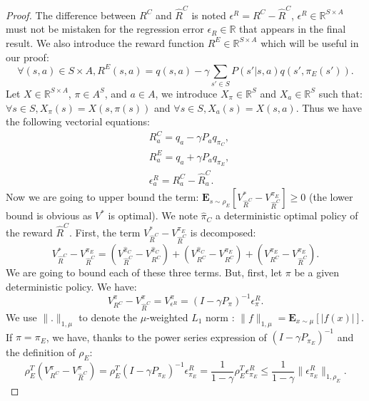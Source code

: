\documentclass[smallextended]{svjour3}
\newcommand{\E}{\mathbf{E}}
\begin{document}
\begin{proof}
The difference between $R^C$ and $\hat{R}^C$ is noted $\epsilon^R=R^C-\hat{R}^C$, $\epsilon^R\in\mathbb{R}^{S\times A}$ must not be mistaken for the regression error $\epsilon_R\in\mathbb{R}$ that appears in the final result.
We also introduce the reward function $R^E\in\mathbb{R}^{S\times A}$ which will be useful in our proof:
\begin{equation}
\forall (s,a)\in S\times A, R^E(s,a)=q(s,a) -\gamma\sum_{s'\in S}P(s'|s,a)q(s',\pi_E(s')).
\end{equation}
Let $X\in\mathbb{R}^{S\times A}$, $\pi\in A^S$, and $a\in A$, we introduce $X_\pi\in\mathbb{R}^S$ and $X_a\in\mathbb{R}^S$ such that: $\forall s\in S, X_\pi(s)=X(s,\pi(s))$ and $\forall s\in S, X_a(s)=X(s,a)$.
Thus we have the following vectorial equations:
\begin{align}
&R^C_a=q_a-\gamma P_aq_{\pi_C},
\\
&R^E_a=q_a+\gamma P_aq_{\pi_E},
\\
&\epsilon^R_a=R^C_a-\hat{R}^C_a.
\end{align}
Now we are going to upper bound the term: $\E_{s\sim\rho_E}[V^*_{\hat{R}^C}-V^{\pi_E}_{\hat{R}^C}]\geq0$ (the lower bound is obvious as $V^*$ is optimal).
We note $\hat{\pi}_C$ a deterministic optimal policy of the reward $\hat{R}^C$. First, the term $V^*_{\hat{R}^C}-V^{\pi_E}_{\hat{R}^C}$ is decomposed:
\begin{equation}
V^*_{\hat{R}^C}-V^{\pi_E}_{\hat{R}^C}=(V^{\hat{\pi}_C}_{\hat{R}^C}-V^{\hat{\pi}_C}_{R^C})+(V^{\hat{\pi}_C}_{R^C}-V^{\pi_E}_{R^C})+(V^{\pi_E}_{R^C}-V^{\pi_E}_{\hat{R}^C}).
\end{equation}
We are going to bound each of these three terms. But, first, let $\pi$ be a given deterministic policy. We have:
\begin{equation}
V^{\pi}_{R^C}-V^{\pi}_{\hat{R}^C}=V^{\pi}_{\epsilon^R}=(I-\gamma P_\pi)^{-1}\epsilon^R_{\pi}.
\end{equation}
We use $\|.\|_{1,\mu}$ to denote the $\mu$-weighted $L_1$ norm : $\|f\|_{1,\mu} = \E_{x\sim \mu}[|f(x)|]$. 
If $\pi=\pi_E$, we have, thanks to the power series expression of $(I-\gamma P_{\pi_E})^{-1}$ and the definition of $\rho_E$:
\begin{equation}
  \rho_E^T(V^{\pi}_{R^C}-V^{\pi}_{\hat{R}^C})=\rho_E^T(I-\gamma P_{\pi_E})^{-1}\epsilon^R_{\pi_E}=\frac{1}{1-\gamma}\rho_E^T\epsilon^R_{\pi_E}\leq\frac{1}{1-\gamma}\|\epsilon^R_{\pi_E}\|_{1,\rho_E}.\end{equation}


\end{proof}
\end{document}
